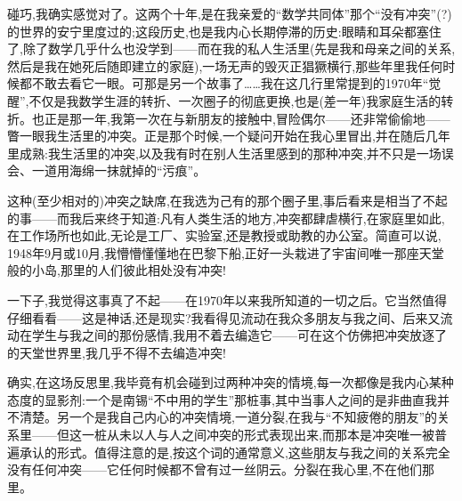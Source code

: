 碰巧,我确实感觉对了。这两个十年,是在我亲爱的“数学共同体”那个“没有冲突”(?)的世界的安宁里度过的;这段历史,也是我内心长期停滞的历史:眼睛和耳朵都塞住了,除了数学几乎什么也没学到——而在我的私人生活里(先是我和母亲之间的关系,然后是我在她死后随即建立的家庭),一场无声的毁灭正猖獗横行,那些年里我任何时候都不敢去看它一眼。可那是另一个故事了……我在这几行里常提到的1970年“觉醒”,不仅是我数学生涯的转折、一次圈子的彻底更换,也是(差一年)我家庭生活的转折。也正是那一年,我第一次在与新朋友的接触中,冒险偶尔——还非常偷偷地——瞥一眼我生活里的冲突。正是那个时候,一个疑问开始在我心里冒出,并在随后几年里成熟:我生活里的冲突,以及我有时在别人生活里感到的那种冲突,并不只是一场误会、一道用海绵一抹就掉的“污痕”。

这种(至少相对的)冲突之缺席,在我选为己有的那个圈子里,事后看来是相当了不起的事——而我后来终于知道:凡有人类生活的地方,冲突都肆虐横行,在家庭里如此,在工作场所也如此,无论是工厂、实验室,还是教授或助教的办公室。简直可以说, 1948年9月或10月,我懵懵懂懂地在巴黎下船,正好一头栽进了宇宙间唯一那座天堂般的小岛,那里的人们彼此相处没有冲突!

一下子,我觉得这事真了不起——在1970年以来我所知道的一切之后。它当然值得仔细看看——这是神话,还是现实?我看得见流动在我众多朋友与我之间、后来又流动在学生与我之间的那份感情,我用不着去编造它——可在这个仿佛把冲突放逐了的天堂世界里,我几乎不得不去编造冲突!

确实,在这场反思里,我毕竟有机会碰到过两种冲突的情境,每一次都像是我内心某种态度的显影剂:一个是南锡“不中用的学生”那桩事,其中当事人之间的是非曲直我并不清楚。另一个是我自己内心的冲突情境,一道分裂,在我与“不知疲倦的朋友”的关系里——但这一桩从未以人与人之间冲突的形式表现出来,而那本是冲突唯一被普遍承认的形式。值得注意的是,按这个词的通常意义,这些朋友与我之间的关系完全没有任何冲突——它任何时候都不曾有过一丝阴云。分裂在我心里,不在他们那里。


